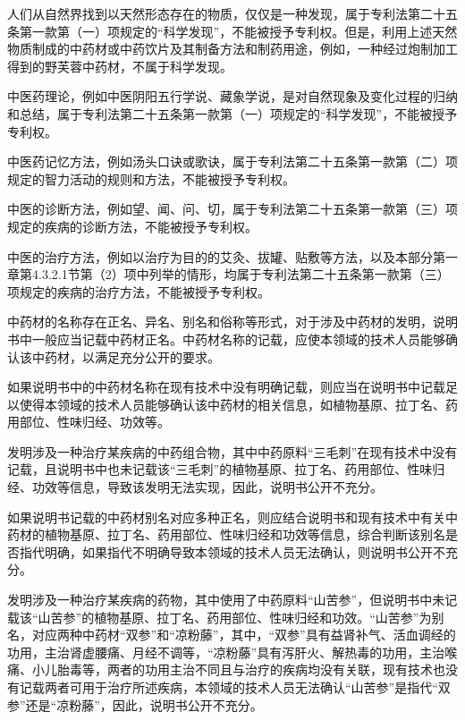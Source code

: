 人们从自然界找到以天然形态存在的物质，仅仅是一种发现，属于专利法第二十五条第一款第（一）项规定的“科学发现”，不能被授予专利权。但是，利用上述天然物质制成的中药材或中药饮片及其制备方法和制药用途，例如，一种经过炮制加工得到的野芙蓉中药材，不属于科学发现。

中医药理论，例如中医阴阳五行学说、藏象学说，是对自然现象及变化过程的归纳和总结，属于专利法第二十五条第一款第（一）项规定的“科学发现”，不能被授予专利权。

中医药记忆方法，例如汤头口诀或歌诀，属于专利法第二十五条第一款第（二）项规定的智力活动的规则和方法，不能被授予专利权。

中医的诊断方法，例如望、闻、问、切，属于专利法第二十五条第一款第（三）项规定的疾病的诊断方法，不能被授予专利权。

中医的治疗方法，例如以治疗为目的的艾灸、拔罐、贴敷等方法，以及本部分第一章第4.3.2.1节第（2）项中列举的情形，均属于专利法第二十五条第一款第（三）项规定的疾病的治疗方法，不能被授予专利权。

中药材的名称存在正名、异名、别名和俗称等形式，对于涉及中药材的发明，说明书中一般应当记载中药材正名。中药材名称的记载，应使本领域的技术人员能够确认该中药材，以满足充分公开的要求。

如果说明书中的中药材名称在现有技术中没有明确记载，则应当在说明书中记载足以使得本领域的技术人员能够确认该中药材的相关信息，如植物基原、拉丁名、药用部位、性味归经、功效等。

{\par}

发明涉及一种治疗某疾病的中药组合物，其中中药原料“三毛刺”在现有技术中没有记载，且说明书中也未记载该“三毛刺”的植物基原、拉丁名、药用部位、性味归经、功效等信息，导致该发明无法实现，因此，说明书公开不充分。

如果说明书记载的中药材别名对应多种正名，则应结合说明书和现有技术中有关中药材的植物基原、拉丁名、药用部位、性味归经和功效等信息，综合判断该别名是否指代明确，如果指代不明确导致本领域的技术人员无法确认，则说明书公开不充分。

{\par}

发明涉及一种治疗某疾病的药物，其中使用了中药原料“山苦参”，但说明书中未记载该“山苦参”的植物基原、拉丁名、药用部位、性味归经和功效。“山苦参”为别名，对应两种中药材“双参”和“凉粉藤”，其中，“双参”具有益肾补气、活血调经的功用，主治肾虚腰痛、月经不调等，“凉粉藤”具有泻肝火、解热毒的功用，主治喉痛、小儿胎毒等，两者的功用主治不同且与治疗的疾病均没有关联，现有技术也没有记载两者可用于治疗所述疾病，本领域的技术人员无法确认“山苦参”是指代“双参”还是“凉粉藤”，因此，说明书公开不充分。

